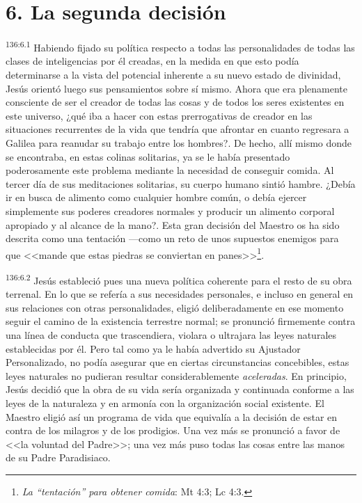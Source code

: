 \section*{6. La segunda decisión}
\par 
\textsuperscript{136:6.1} Habiendo fijado su política respecto a todas las personalidades de todas las clases de inteligencias por él creadas, en la medida en que esto podía determinarse a la vista del potencial inherente a su nuevo estado de divinidad, Jesús orientó luego sus pensamientos sobre sí mismo. Ahora que era plenamente consciente de ser el creador de todas las cosas y de todos los seres existentes en este universo, ¿qué iba a hacer con estas prerrogativas de creador en las situaciones recurrentes de la vida que tendría que afrontar en cuanto regresara a Galilea para reanudar su trabajo entre los hombres?. De hecho, allí mismo donde se encontraba, en estas colinas solitarias, ya se le había presentado poderosamente este problema mediante la necesidad de conseguir comida. Al tercer día de sus meditaciones solitarias, su cuerpo humano sintió hambre. ¿Debía ir en busca de alimento como cualquier hombre común, o debía ejercer simplemente sus poderes creadores normales y producir un alimento corporal apropiado y al alcance de la mano?. Esta gran decisión del Maestro os ha sido descrita como una tentación ---como un reto de unos supuestos enemigos para que <<mande que estas piedras se conviertan en panes>>\footnote{\textit{La ``tentación'' para obtener comida}: Mt 4:3; Lc 4:3.}.

\par 
\textsuperscript{136:6.2} Jesús estableció pues una nueva política coherente para el resto de su obra terrenal. En lo que se refería a sus necesidades personales, e incluso en general en sus relaciones con otras personalidades, eligió deliberadamente en ese momento seguir el camino de la existencia terrestre normal; se pronunció firmemente contra una línea de conducta que trascendiera, violara o ultrajara las leyes naturales establecidas por él. Pero tal como ya le había advertido su Ajustador Personalizado, no podía asegurar que en ciertas circunstancias concebibles, estas leyes naturales no pudieran resultar considerablemente \textit{aceleradas}. En principio, Jesús decidió que la obra de su vida sería organizada y continuada conforme a las leyes de la naturaleza y en armonía con la organización social existente. El Maestro eligió así un programa de vida que equivalía a la decisión de estar en contra de los milagros y de los prodigios. Una vez más se pronunció a favor de <<la voluntad del Padre>>; una vez más puso todas las cosas entre las manos de su Padre Paradisiaco.


